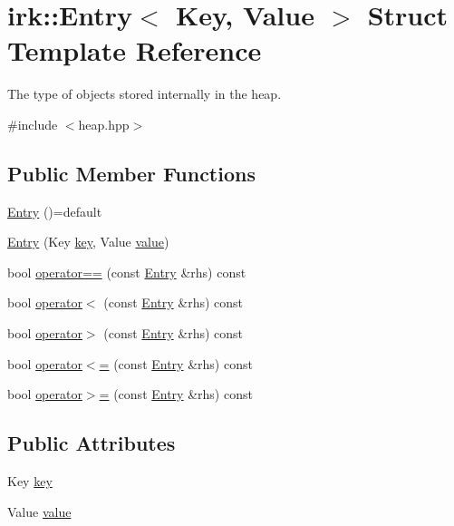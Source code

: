 \hypertarget{structirk_1_1Entry}{}\section{irk\+:\+:Entry$<$ Key, Value $>$ Struct Template Reference}
\label{structirk_1_1Entry}


The type of objects stored internally in the heap.  




{\ttfamily \#include $<$heap.\+hpp$>$}

\subsection*{Public Member Functions}
\begin{DoxyCompactItemize}
\item 
\mbox{\hyperlink{structirk_1_1Entry_a648740a9fb42c6dad26fe160991dd940}{Entry}} ()=default
\item 
\mbox{\hyperlink{structirk_1_1Entry_a9978964cb5b64644437ab0bde27f0e05}{Entry}} (Key \mbox{\hyperlink{structirk_1_1Entry_a49866a2c0c5ee90f6a8a548c9b9e3d14}{key}}, Value \mbox{\hyperlink{structirk_1_1Entry_a880c6961b017dc4bfc6ff5e635664aab}{value}})
\item 
bool \mbox{\hyperlink{structirk_1_1Entry_af34b12a16d6282739e7172d4f1311ba7}{operator==}} (const \mbox{\hyperlink{structirk_1_1Entry}{Entry}} \&rhs) const
\item 
bool \mbox{\hyperlink{structirk_1_1Entry_a51a009e127da74080b304a70f629aebe}{operator$<$}} (const \mbox{\hyperlink{structirk_1_1Entry}{Entry}} \&rhs) const
\item 
bool \mbox{\hyperlink{structirk_1_1Entry_a629565fa309239a70fbc9a0eac5a19a8}{operator$>$}} (const \mbox{\hyperlink{structirk_1_1Entry}{Entry}} \&rhs) const
\item 
bool \mbox{\hyperlink{structirk_1_1Entry_a0854fbab2a9e88753432a8b8c7d91997}{operator$<$=}} (const \mbox{\hyperlink{structirk_1_1Entry}{Entry}} \&rhs) const
\item 
bool \mbox{\hyperlink{structirk_1_1Entry_ac39aa16af8eb24507233d2f508ca95f3}{operator$>$=}} (const \mbox{\hyperlink{structirk_1_1Entry}{Entry}} \&rhs) const
\end{DoxyCompactItemize}
\subsection*{Public Attributes}
\begin{DoxyCompactItemize}
\item 
Key \mbox{\hyperlink{structirk_1_1Entry_a49866a2c0c5ee90f6a8a548c9b9e3d14}{key}}
\item 
Value \mbox{\hyperlink{structirk_1_1Entry_a880c6961b017dc4bfc6ff5e635664aab}{value}}
\end{DoxyCompactItemize}
